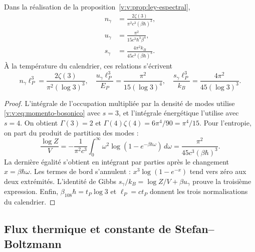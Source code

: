 \begin{proposition}
\label{v:v:prop:densidades-termicas}
Dans la réalisation de la proposition~\ref{v:v:prop:ley-espectral},
\begin{align}
 n_\gamma&=\frac{2\zeta(3)}{\pi^2c^3(\beta\hbar)^3},\\
 u_\gamma&=\frac{\pi^2}{15c^3\hbar^3\beta^4},\\
 s_\gamma&=\frac{4\pi^2 k_B}{45c^3(\beta\hbar)^3}.
 \label{v:v:eq:densidades-termicas}
\end{align}
À la température du calendrier, ces relations s’écrivent
\begin{equation}
 n_\gamma\ell_P^3=\frac{2\zeta(3)}{\pi^2(\log3)^3},\quad
 \frac{u_\gamma\ell_P^3}{E_P}=\frac{\pi^2}{15(\log3)^4},\quad
 \frac{s_\gamma\ell_P^3}{k_B}=\frac{4\pi^2}{45(\log3)^3}.
 \label{v:v:eq:densidades-calendario}
\end{equation}
\end{proposition}

\begin{proof}
L’intégrale de l’occupation multipliée par la densité de modes utilise
\eqref{v:v:eq:momento-bosonico} avec \(s=3\), et l’intégrale énergétique
l’utilise avec \(s=4\). On obtient \(\Gamma(3)=2\) et
\(\Gamma(4)\zeta(4)=6\pi^4/90=\pi^4/15\).
Pour l’entropie, on part du produit de partition des modes :
\[
 \frac{\log Z}{V}=-\frac{1}{\pi^2c^3}
 \int_0^\infty\omega^2
 \log(1-e^{-\beta\hbar\omega})\,d\omega
 =\frac{\pi^2}{45c^3(\beta\hbar)^3}.
\]
La dernière égalité s’obtient en intégrant par parties après le changement
\(x=\beta\hbar\omega\). Les termes de bord s’annulent :
\(x^3\log(1-e^{-x})\) tend vers zéro aux deux extrémités.
L’identité de Gibbs \(s_\gamma/k_B=\log Z/V+\beta u_\gamma\)
prouve la troisième expression. Enfin,
\(\beta_{108}\hbar=t_P\log3\) et \(\ell_P=ct_P\) donnent les trois
normalisations du calendrier.
\end{proof}

\subsection{Flux thermique et constante de Stefan--Boltzmann}

